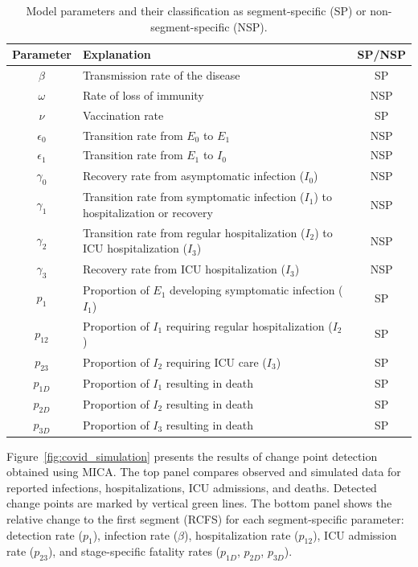 \documentclass[10pt,letterpaper]{article}
\providecommand{\DIFaddend}{} %
\DeclareRobustCommand{\DIFaddend}{\DIFOaddend \let\includegraphics\DIFOincludegraphics} %
\begin{document}
\DIFaddend \begin{table}[h!]
\small
\centering
\begin{tabularx}{\textwidth}{|c|X|c|}
\hline
\textbf{Parameter} & \textbf{Explanation} & \textbf{SP/NSP} \\ \hline
\( \beta \) & Transmission rate of the disease & SP \\ \hline
\( \omega \) & Rate of loss of immunity & NSP \\ \hline
\( \nu \) & Vaccination rate & SP \\ \hline
\( \epsilon_0 \) & Transition rate from \( E_0 \) to \( E_1 \) & NSP \\ \hline
\( \epsilon_1 \) & Transition rate from \( E_1 \) to \( I_0 \) & NSP \\ \hline
\( \gamma_0 \) & Recovery rate from asymptomatic infection (\( I_0 \)) & NSP \\ \hline
\( \gamma_1 \) & Transition rate from symptomatic infection (\( I_1 \)) to hospitalization or recovery & NSP \\ \hline
\( \gamma_2 \) & Transition rate from regular hospitalization (\( I_2 \)) to ICU hospitalization (\( I_3 \)) & NSP \\ \hline
\( \gamma_3 \) & Recovery rate from ICU hospitalization (\( I_3 \)) & NSP \\ \hline
\( p_1 \) & Proportion of \( E_1 \) developing symptomatic infection (\( I_1 \)) & SP \\ \hline
\( p_{12} \) & Proportion of \( I_1 \) requiring regular hospitalization (\( I_2 \)) & SP \\ \hline
\( p_{23} \) & Proportion of \( I_2 \) requiring ICU care (\( I_3 \)) & SP \\ \hline
\( p_{1D} \) & Proportion of \( I_1 \) resulting in death & SP \\ \hline
\( p_{2D} \) & Proportion of \( I_2 \) resulting in death & SP \\ \hline
\( p_{3D} \) & Proportion of \( I_3 \) resulting in death & SP \\ \hline
\end{tabularx}
\caption{Model parameters and their classification as segment-specific (SP) or non-segment-specific (NSP).}
\label{tab:parameters}
\end{table}


Figure~\ref{fig:covid_simulation} presents the results of change point
detection obtained using MICA. The top panel compares observed and simulated data for reported infections, hospitalizations, ICU admissions, and deaths. Detected change points are marked by vertical green lines. The bottom panel shows the relative change to the first segment (RCFS) for each segment-specific parameter: detection rate ($p_1$), infection rate ($\beta$), hospitalization rate ($p_{12}$), ICU admission rate ($p_{23}$), and stage-specific fatality rates ($p_{1D}$, $p_{2D}$, $p_{3D}$).
\end{document}
